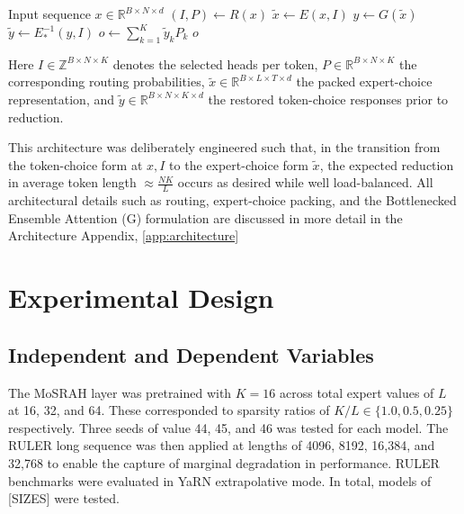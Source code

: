\documentclass[11pt]{article}
\begin{document}
\begin{algorithm}[H]
\caption{MoSRAH Forward Pass}
\label{alg:mosrah}
\begin{algorithmic}[1]
\Require Input sequence $x \in \mathbb{R}^{B \times N \times d}$
\State $(I, P) \gets R(x)$ 
\State $\tilde{x} \gets E(x, I)$ 
\State $y \gets G(\tilde{x})$ 
\State $\tilde{y} \gets E_*^{-1}(y, I)$ 
\State $o \gets \sum_{k=1}^{K} \tilde{y}_k P_k$ 
\State \Return $o$
\end{algorithmic}
\end{algorithm}

Here $I \in \mathbb{Z}^{B \times N \times K}$ denotes the selected heads per token, $P \in \mathbb{R}^{B \times N \times K}$ the corresponding routing probabilities, $\tilde{x} \in \mathbb{R}^{B \times L \times T \times d}$ the packed expert-choice representation, and $\tilde{y} \in \mathbb{R}^{B \times N \times K \times d}$ the restored token-choice responses prior to reduction.

This architecture was deliberately engineered such that, in the transition from the token-choice form at $x, I$ to the expert-choice form $\tilde{x}$, the expected reduction in average token length $\approx \frac{NK}{L}$ occurs as desired while well load-balanced. All architectural details such as  routing, expert-choice packing, and the Bottlenecked Ensemble Attention (G) formulation are discussed in more detail in the Architecture Appendix, \ref{app:architecture}

\section{Experimental Design}

\subsection{Independent and Dependent Variables}

The MoSRAH layer was pretrained with $K=16$ across total expert values of $L$ at 16, 32, and 64. These corresponded to sparsity ratios of $K/L \in \{1.0, 0.5, 0.25\}$ respectively. Three seeds of value 44, 45, and 46 was tested for each model. The RULER long sequence was then applied at lengths of 4096, 8192, 16,384, and 32,768 to enable the capture of marginal degradation in performance. RULER benchmarks were evaluated in YaRN extrapolative mode. In total, models of [SIZES] were tested.
\end{document}
